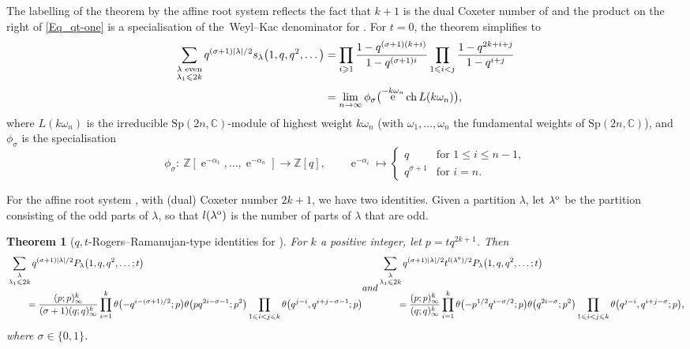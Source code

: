 \documentclass[pdftex]{sigma}
\numberwithin{equation}{section}
\newtheorem{Theorem}{Theorem}[section]
\renewcommand{\leq}{\leqslant}
\renewcommand{\geq}{\geqslant}
\DeclareMathOperator{\eup}{e}
\DeclareMathOperator{\ch}{ch}
\newcommand{\abs}[1]{\vert#1\vert}
\newcommand{\la}{\lambda}
\begin{document}
The labelling of the theorem by the affine root system
 reflects the fact that $k+1$ is the dual Coxeter
number of  and the product on the right
of \eqref{Eq_qt-one} is a specialisation of the~Weyl--Kac
denominator for .
For $t=0$, the theorem simplifies to
\begin{align}
\sum_{\substack{\la\text{ even} \\[1pt] \la_1\leq 2k}}
q^{(\sigma+1)\abs{\la}/2} s_{\la}\bigl(1,q,q^2,\dots\bigr)
&=\prod_{i\geq 1} \frac{1-q^{(\sigma+1)(k+i)}}{1-q^{(\sigma+1)i}}
\prod_{1\leq i<j} \frac{1-q^{2k+i+j}}{1-q^{i+j}} \notag \\
&=\lim_{n\to\infty} \phi_{\sigma}
\bigl(\eup^{-k\omega_n}\ch L(k\omega_n)\bigr),
\label{Eq_C}
\end{align}
where $L(k\omega_n)$ is the irreducible
$\mathrm{Sp}(2n,\mathbb{C})$-module of highest weight $k\omega_n$
(with $\omega_1,\dots,\omega_n$ the fundamental weights of
$\mathrm{Sp}(2n,\mathbb{C})$), and $\phi_{\sigma}$
is the specialisation
\[
\phi_{\sigma}\colon\ \mathbb{Z}[\eup^{-\alpha_1},\dots,\eup^{-\alpha_n}]
\to\mathbb{Z}[q],\qquad
\eup^{-\alpha_i}\mapsto \begin{cases}
q & \text{for $1\leq i\leq n-1$}, \\
q^{\sigma+1} & \text{for $i=n$}.\end{cases}
\]

For the affine root system , with (dual)
Coxeter number $2k+1$, we have two identities.
Given a partition $\la$, let $\la^{\textup{o}}$ be the partition consisting
of the odd parts of $\la$, so that $l(\la^{\textup{o}})$ is the number of
parts of $\la$ that are odd.

\begin{Theorem}[$q,t$-Rogers--Ramanujan-type identities for
]\label{Thm_qtRR2}
For $k$ a positive integer, let $p=tq^{2k+1}$.
Then
\begin{subequations}
\begin{align}
&\sum_{\substack{\la \\[1pt] \la_1\leq 2k}}
q^{(\sigma+1)\abs{\la}/2} P_{\la}\bigl(1,q,q^2,\dots;t\bigr) \label{Eq_A2k2a}\\
&\qquad=\frac{(p;p)_{\infty}^k}
{(\sigma+1)(q;q)_{\infty}^k}
\prod_{i=1}^k \theta\bigl({-}q^{i-(\sigma+1)/2};p\bigr)
\theta\bigl(pq^{2i-\sigma-1};p^2\bigr)
\prod_{1\leq i<j\leq k}\theta\bigl(q^{j-i},q^{i+j-\sigma-1};p\bigr)
\notag
\end{align}
and
\begin{align}
&\sum_{\substack{\la \\[1pt] \la_1\leq 2k}}
q^{(\sigma+1)\abs{\la}/2}t^{l(\la^{\textup{o}})/2}
P_{\la}\bigl(1,q,q^2,\dots;t\bigr) \label{Eq_A2k2b}\\
&\qquad=\frac{(p;p)_{\infty}^k}{(q;q)_{\infty}^k}
\prod_{i=1}^k \theta\bigl({-}p^{1/2}q^{i-\sigma/2};p\bigr)
\theta\bigl(q^{2i-\sigma};p^2\bigr)
\prod_{1\leq i<j\leq k}\theta\bigl(q^{j-i},q^{i+j-\sigma};p\bigr),
\notag
\end{align}
\end{subequations}
where $\sigma\in\{0,1\}$.
\end{Theorem}
\end{document}

